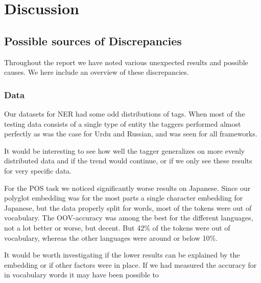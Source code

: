 
\section{Discussion}

\subsection{Possible sources of Discrepancies}

Throughout the report we have noted various unexpected results and possible
causes. We here include an overview of these discrepancies.

\subsubsection{Data}

Our datasets for NER had some odd distributions of tags. When most of the
testing data consists of a single type of entity the taggers performed almost
perfectly as was the case for Urdu and Russian, and was seen for all frameworks.

It would be interesting to see how well the tagger generalizes on more evenly
distributed data and if the trend would continue, or if we only see these
results for very specific data.

For the POS task we noticed significantly worse results on Japanese. Since our
polyglot embedding was for the most parts a single character embedding for
Japanese, but the data properly split for words, most of the tokens were out of
vocabulary. The OOV-accuracy was among the best for the different languages, not
a lot better or worse, but decent. But 42\% of the tokens were out of
vocabulary, whereas the other languages were around or below 10\%.

It would be worth investigating if the lower results can be explained by the
embedding or if other factors were in place. If we had measured the accuracy for
in vocabulary words it may have been possible to 




